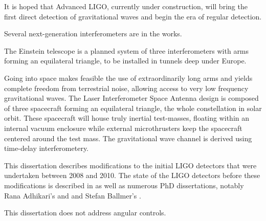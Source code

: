 
It is hoped that Advanced LIGO, currently under construction, will
bring the first direct detection of gravitational waves and begin the
era of regular detection.

Several next-generation interferometers are in the works. 

The Einstein telescope is a planned system of three interferometers
with arms forming an equilateral triangle, to be installed in tunnels
deep under Europe.

Going into space makes feasible the use of extraordinarily long arms
and yields complete freedom from terrestrial noise, allowing access to
very low frequency gravitational waves.  The Laser Interferometer
Space Antenna design is composed of three spacecraft forming an
equilateral triangle, the whole constellation in solar orbit.  These
spacecraft will house truly inertial test-masses, floating within an
internal vacuum enclosure while external microthrusters keep the
spacecraft centered around the test mass.  The gravitational wave
channel is derived using time-delay interferometery.


This dissertation describes modifications to the initial LIGO
detectors that were undertaken between 2008 and 2010.  The state of
the LIGO detectors before these modifications is described in
\cite{S5InstrumentPaper} as well as numerous PhD dissertations,
notably Rana Adhikari's \cite{RanaThesis} and and Stefan Ballmer's
\cite{Ballmer2006LIGO}.

This dissertation does not address angular controls.
